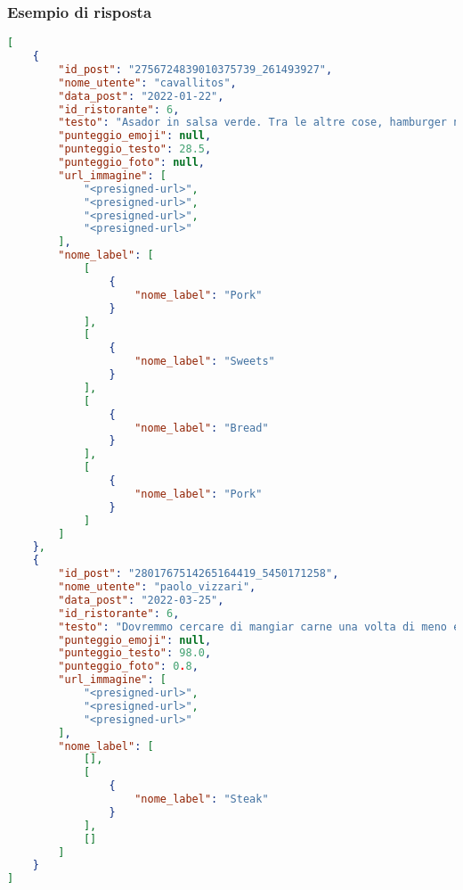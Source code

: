 \subsubsection{Esempio di risposta}
\begin{lstlisting}[language=json, caption={Esempio di risposta \texttt{/getLabelAndPost}}, captionpos=b]
[
    {
        "id_post": "2756724839010375739_261493927",
        "nome_utente": "cavallitos",
        "data_post": "2022-01-22",
        "id_ristorante": 6,
        "testo": "Asador in salsa verde. Tra le altre cose, hamburger nippo-piemontese di wagyu e vicciola.",
        "punteggio_emoji": null,
        "punteggio_testo": 28.5,
        "punteggio_foto": null,
        "url_immagine": [
            "<presigned-url>",
            "<presigned-url>",
            "<presigned-url>",
            "<presigned-url>"
        ],
        "nome_label": [
            [
                {
                    "nome_label": "Pork"
                }
            ],
            [
                {
                    "nome_label": "Sweets"
                }
            ],
            [
                {
                    "nome_label": "Bread"
                }
            ],
            [
                {
                    "nome_label": "Pork"
                }
            ]
        ]
    },
    {
        "id_post": "2801767514265164419_5450171258",
        "nome_utente": "paolo_vizzari",
        "data_post": "2022-03-25",
        "id_ristorante": 6,
        "testo": "Dovremmo cercare di mangiar carne una volta di meno e mangiarla dieci volte meglio. \n \n Roberto e' il mio personale sacerdote della bistecca, l'unico capace di emozionarmi tre volte per ogni ciccia: quando la racconta, mentre la cuoce e colpo finale al morso. Un sardone trapiantato a Torino col cuore grande come le sue costate e prezioso come le sue  frollature perfette.\n\nCi vuol poco a bruciare una poesia, molto piu' amore per scriverne i versi con la brace.",
        "punteggio_emoji": null,
        "punteggio_testo": 98.0,
        "punteggio_foto": 0.8,
        "url_immagine": [
            "<presigned-url>",
            "<presigned-url>",
            "<presigned-url>"
        ],
        "nome_label": [
            [],
            [
                {
                    "nome_label": "Steak"
                }
            ],
            []
        ]
    }
]

\end{lstlisting}

\pagebreak







